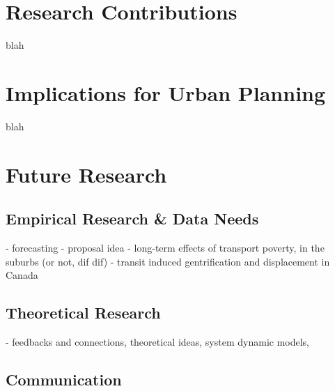 
\section{Research Contributions}


blah


\section{Implications for Urban Planning}

blah


\section{Future Research}

\subsection{Empirical Research \& Data Needs}

- forecasting - proposal idea
- long-term effects of transport poverty, in the suburbs (or not, dif dif)
- transit induced gentrification and displacement in Canada

\subsection{Theoretical Research}

- feedbacks and connections, theoretical ideas, system dynamic models, 

\subsection{Communication}




